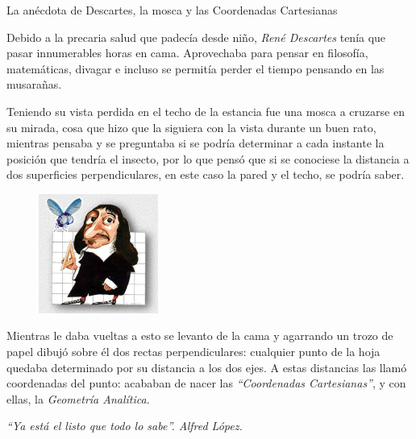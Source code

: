 \begin{myexampleblock}{La anécdota de Descartes, la mosca y las Coordenadas Cartesianas}

\vspace{2mm}Debido a la precaria salud que padecía desde niño, \emph{René Descartes} tenía que pasar innumerables horas en cama. Aprovechaba para pensar en filosofía, matemáticas, divagar e incluso se permitía perder el tiempo pensando en las musarañas.

\begin{multicols}{2}
\vspace{2mm}Teniendo su vista perdida en el techo de la estancia fue una mosca a cruzarse en su mirada, cosa que hizo que la siguiera con la vista durante un buen rato, mientras pensaba y se preguntaba si se podría determinar a cada instante la posición que tendría el insecto, por lo que pensó que si se conociese la distancia a dos superficies perpendiculares, en este caso la pared y el techo, se podría saber.

\begin{figure}[H]
	\centering
	\includegraphics[width=0.35\textwidth]{img-ga/ga01.png}
\end{figure}
\end{multicols}

\vspace{2mm}Mientras le daba vueltas a esto se levanto de la cama y agarrando un trozo de papel dibujó sobre él dos rectas perpendiculares: cualquier punto de la hoja quedaba determinado por su distancia a los dos ejes. A estas distancias las llamó coordenadas del punto: acababan de nacer las \emph{``Coordenadas Cartesianas''}, y con ellas, la \emph{Geometría Analítica}.	

\vspace{2mm}\begin{flushright}\begin{scriptsize} \textit{``Ya está el listo que todo lo sabe''. Alfred López.} \end{scriptsize} \end{flushright}
\end{myexampleblock}

